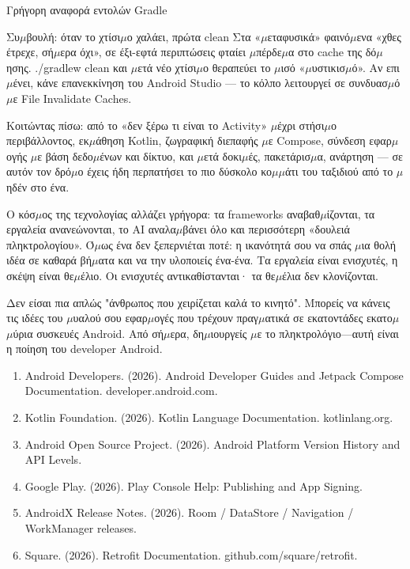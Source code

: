 \begin{center}\small\color{gray}Γρήγορη αναφορά εντολών Gradle\end{center}

\begin{tcbinfo}{Συ$\mu$βουλή: όταν το χτίσι$\mu$ο χαλάει, πρώτα clean}
Στα «$\mu$εταφυσικά» φαινό$\mu$ενα «χθες έτρεχε, σή$\mu$ερα όχι», σε έξι-εφτά περιπτώσεις φταίει $\mu$πέρδε$\mu$α στο cache της δό$\mu$ησης. ./gradlew clean και $\mu$ετά νέο χτίσι$\mu$ο θεραπεύει το $\mu$ισό «$\mu$υστικισ$\mu$ό». Αν επι$\mu$ένει, κάνε επανεκκίνηση του Android Studio — το κόλπο λειτουργεί σε συνδυασ$\mu$ό $\mu$ε File Invalidate Caches.

\end{tcbinfo}



Κοιτώντας πίσω: από το «δεν ξέρω τι είναι το Activity» $\mu$έχρι στήσι$\mu$ο περιβάλλοντος, εκ$\mu$άθηση Kotlin, ζωγραφική διεπαφής $\mu$ε Compose, σύνδεση εφαρ$\mu$ογής $\mu$ε βάση δεδο$\mu$ένων και δίκτυο, και $\mu$ετά δοκι$\mu$ές, πακετάρισ$\mu$α, ανάρτηση — σε αυτόν τον δρό$\mu$ο έχεις ήδη περπατήσει το πιο δύσκολο κο$\mu$$\mu$άτι του ταξιδιού από το $\mu$ηδέν στο ένα.

Ο κόσ$\mu$ος της τεχνολογίας αλλάζει γρήγορα: τα frameworks αναβαθ$\mu$ίζονται, τα εργαλεία ανανεώνονται, το AI αναλα$\mu$βάνει όλο και περισσότερη «δουλειά πληκτρολογίου». Ό$\mu$ως ένα δεν ξεπερνιέται ποτέ: η ικανότητά σου να σπάς $\mu$ια θολή ιδέα σε καθαρά βή$\mu$ατα και να την υλοποιείς ένα-ένα. Τα εργαλεία είναι ενισχυτές, η σκέψη είναι θε$\mu$έλιο. Οι ενισχυτές αντικαθίστανται· τα θε$\mu$έλια δεν κλονίζονται.

Δεν είσαι πια απλώς "άνθρωπος που χειρίζεται καλά το κινητό". Μπορείς να κάνεις τις ιδέες του $\mu$υαλού σου εφαρ$\mu$ογές που τρέχουν πραγ$\mu$ατικά σε εκατοντάδες εκατο$\mu$$\mu$ύρια συσκευές Android. Από σή$\mu$ερα, δη$\mu$ιουργείς $\mu$ε το πληκτρολόγιο—αυτή είναι η ποίηση του developer Android.


\begin{enumerate}
  \item Android Developers. (2026). Android Developer Guides and Jetpack Compose Documentation. developer.android.com.
  \item Kotlin Foundation. (2026). Kotlin Language Documentation. kotlinlang.org.
  \item Android Open Source Project. (2026). Android Platform Version History and API Levels.
  \item Google Play. (2026). Play Console Help: Publishing and App Signing.
  \item AndroidX Release Notes. (2026). Room / DataStore / Navigation / WorkManager releases.
  \item Square. (2026). Retrofit Documentation. github.com/square/retrofit.
\end{enumerate}
